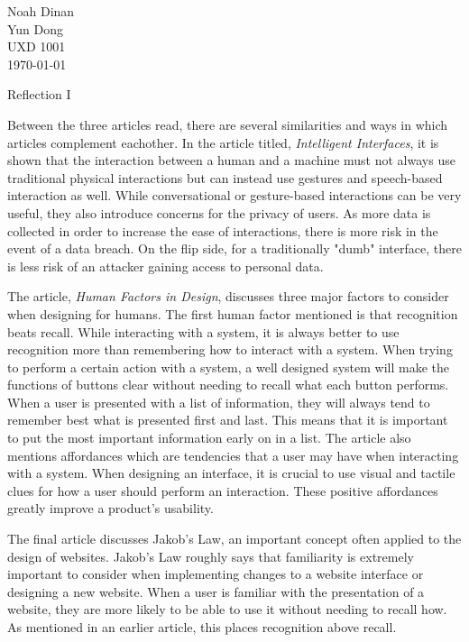 \documentclass[12pt]{article}
\begin{document}

\newpage
\noindent
Noah Dinan \\ Yun Dong \\ UXD 1001 \\ \today \\

\begin{center}
Reflection I
\end{center}

\setlength{\parindent}{0.5in}

Between the three articles read, there are several similarities and ways in which articles complement
eachother. In the article titled, \textit{Intelligent Interfaces}, it is shown that the interaction between a human
and a machine must not always use traditional physical interactions but can instead use gestures and speech-based interaction
as well. While conversational or gesture-based interactions can be very useful, they also introduce concerns for the
privacy of users. As more data is collected in order to increase the ease of interactions, there is more risk
in the event of a data breach. On the flip side, for a traditionally "dumb" interface, there is less risk of an attacker gaining
access to personal data.

The article, \textit{Human Factors in Design}, discusses three major factors to consider when designing for humans.
The first human factor mentioned is that recognition beats recall. While interacting with a system, it is always better to
use recognition more than remembering how to interact with a system. When trying to perform a certain action with a system,
a well designed system will make the functions of buttons clear without needing to recall what each button performs.
When a user is presented with a list of information, they will always tend to remember best what is presented first and last.
This means that it is important to put the most important information early on in a list. The article also mentions affordances
which are tendencies that a user may have when interacting with a system. When designing an interface, it is crucial to use visual
and tactile clues for how a user should perform an interaction. These positive affordances greatly improve a product's usability.

The final article discusses Jakob's Law, an important concept often applied to the design of websites.
Jakob's Law roughly says that familiarity is extremely important to consider when implementing changes to a website interface
or designing a new website. When a user is familiar with the presentation of a website, they are more likely to be able to use it
without needing to recall how. As mentioned in an earlier article, this places recognition above recall.
\end{document}

